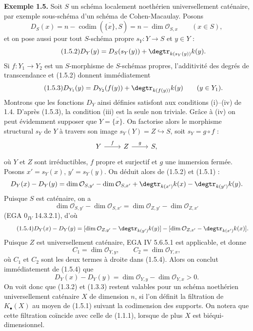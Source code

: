 \documentclass[11pt]{article}
\providecommand{\codim}{\operatorname{codim}}
\providecommand{\codim}{\operatorname{codim}}
\begin{document}
\textbf{Exemple 1.5.} Soit $S$ un schéma localement noethérien universellement caténaire, par exemple sous-schéma d'un schéma de Cohen-Macaulay. Posons
\begin{equation}\tag{1.5.1}
D_S(x)=n-\codim(\overline{\{x\}},S)=n-\dim\mathcal O_{S,x}\qquad(x\in S),
\end{equation}
et on pose aussi pour tout $S$-schéma propre $s_Y:Y\to S$ et $y\in Y$ :
\begin{equation}\tag{1.5.2}
D_Y(y)=D_S(s_Y(y))+\degtr_{k(s_Y(y))}k(y).
\end{equation}
Si $f:Y_1\to Y_2$ est un $S$-morphisme de $S$-schémas propres, l'additivité des degrés de transcendance et (1.5.2) donnent immédiatement
\begin{equation}\tag{1.5.3}
D_{Y_1}(y)=D_{Y_2}(f(y))+\degtr_{k(f(y))}k(y)\qquad(y\in Y_1).
\end{equation}
Montrons que les fonctions $D_Y$ ainsi définies satisfont aux conditions (i)--(iv) de 1.4. D'après (1.5.3), la condition (iii) est la seule non triviale. Grâce à (iv) on peut évidemment supposer que $Y=\overline{\{x\}}$. On factorise alors le morphisme structural $s_Y$ de $Y$ à travers son image $s_Y(Y)=Z\hookrightarrow S$, soit $s_Y=g\circ f$ :
\[
\begin{tikzcd}
Y \arrow[r,"f"] & Z \arrow[r,"g"] & S,
\end{tikzcd}
\]
où $Y$ et $Z$ sont irréductibles, $f$ propre et surjectif et $g$ une immersion fermée. Posons $x'=s_Y(x)$, $y'=s_Y(y)$. On déduit alors de (1.5.2) et (1.5.1) :
\[
D_Y(x)-D_Y(y)=\dim\mathcal O_{S,y'}-\dim\mathcal O_{S,x'}+\degtr_{k(x')}k(x)-\degtr_{k(y')}k(y).
\]
Puisque $S$ est caténaire, on a
\[
\dim\mathcal O_{S,y'}-\dim\mathcal O_{S,x'}=\dim\mathcal O_{Z,y'}-\dim\mathcal O_{Z,x'}
\]
(EGA $0_{IV}$ 14.3.2.1), d'où
\begin{equation}\tag{1.5.4}
D_Y(x)-D_Y(y)=
[\dim\mathcal O_{Z,y'}-\degtr_{k(y')}k(y)]-[\dim\mathcal O_{Z,x'}-\degtr_{k(x')}k(x)].
\end{equation}
Puisque $Z$ est universellement caténaire, EGA IV 5.6.5.1 est applicable, et donne
\[
C_1=\dim\mathcal O_{Y,y},\qquad C_2=\dim\mathcal O_{Y,x},
\]
où $C_1$ et $C_2$ sont les deux termes à droite dans (1.5.4). Alors on conclut immédiatement de (1.5.4) que
\[
D_Y(x)-D_Y(y)=\dim\mathcal O_{Y,y}-\dim\mathcal O_{Y,x}>0.
\]
On voit donc que (1.3.2) et (1.3.3) restent valables pour un schéma noethérien universellement caténaire $X$ de dimension $n$, si l'on définit la filtration de $K_\bullet(X)$ au moyen de (1.5.1) suivant la codimension des supports. On notera que cette filtration coïncide avec celle de (1.1.1), lorsque de plus $X$ est biéqui-dimensionnel.
\end{document}
